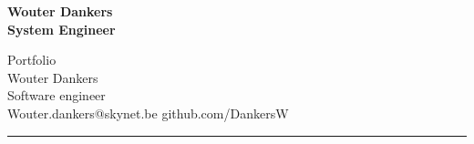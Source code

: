 \documentclass[a4paper,12pt,final]{memoir}
\begin{document}
\Huge\bfseries {\color{RoyalBlue} Wouter Dankers} \\
\Large\bfseries  System Engineer \\

\normalsize\normalfont

Portfolio \\
Wouter Dankers \\
Software engineer \\
Wouter.dankers@skynet.be
github.com/DankersW

\par\noindent\textcolor{RoyalBlue}{\rule{\textwidth}{1.5pt}}%






\end{document}
